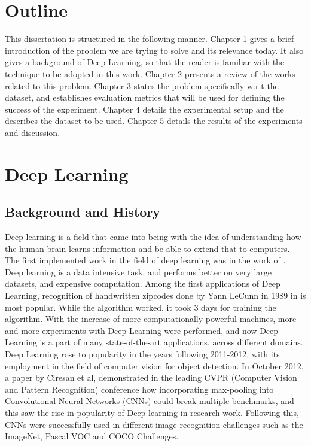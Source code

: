 \section{Outline}
This dissertation is structured in the following manner. Chapter 1 gives a brief introduction of the problem we are trying to solve and its relevance today. It also gives a background of Deep Learning, so that the reader is familiar with the technique to be adopted in this work. Chapter 2 presents a review of the works related to this problem. Chapter 3 states the problem specifically w.r.t the dataset, and establishes evaluation metrics that will be used for defining the success of the experiment. Chapter 4 details the experimental setup and the describes the dataset to be used. Chapter 5 details the results of the experiments and discussion.






\section{Deep Learning}
\subsection{Background and History}
Deep learning is a field that came into being with the idea of understanding how the human brain learns information and be able to extend that to computers.
The first implemented work in the field of deep learning was in the work of \citet{ivakhnenko_cybernetic_1973}.
Deep learning is a data intensive task, and performs better on very large datasets, and expensive computation. Among the first applications of Deep Learning, recognition of handwritten zipcodes done by Yann LeCunn in 1989 in \cite{lecun_backpropagation_1989} is most popular. While the algorithm worked, it took 3 days for training the algorithm.
With the increase of more computationally powerful machines, more and more experiments with Deep Learning were performed, and now Deep Learning is a part of many state-of-the-art applications, across different domains\cite{sak_fast_2015}\cite{deng_deep_2013}\cite{li_constructing_2014}. Deep Learning rose to popularity in the years following 2011-2012, with its employment in the field of computer vision for object detection. In October 2012, a paper by Ciresan et al, demonstrated in the leading CVPR (Computer Vision and Pattern Recognition) conference  how incorporating max-pooling into Convolutional Neural Networks (CNNs) could break multiple benchmarks, and this saw the rise in popularity of Deep learning in research work. Following this, CNNs were successfully used in different image recognition challenges such as the ImageNet\cite{deng_imagenet:_2009}, Pascal VOC\cite{everingham_pascal_2010} and COCO\cite{lin_microsoft_2014} Challenges.

